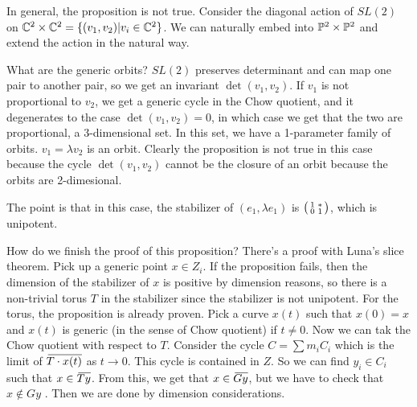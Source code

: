 \begin{remark}
 In general, the proposition is not true. Consider the diagonal action of $SL(2)$ on $\mathbb{C}^2\times \mathbb{C}^2=\{(v_1,v_2)|v_i\in \mathbb{C}^2\}$. We can naturally embed into $\mathbb{P}^2\times \mathbb{P}^2$ and extend the action in the natural way.
 
 What are the generic orbits? $SL(2)$ preserves determinant and can map one pair to another pair, so we get an invariant $\det(v_1,v_2)$. If $v_1$ is not proportional to $v_2$, we get a generic cycle in the Chow quotient, and it degenerates to the case $\det(v_1,v_2)=0$, in which case we get that the two are proportional, a 3-dimensional set. In this set, we have a 1-parameter family of orbits. $v_1=\lambda v_2$ is an orbit. Clearly the proposition is not true in this case because the cycle $\det(v_1,v_2)$ cannot be the closure of an orbit because the orbits are 2-dimesional.
 
 The point is that in this case, the stabilizer of $(e_1,\lambda e_1)$ is $\bigl(\begin{smallmatrix} 1&*\\ 0&1 \end{smallmatrix}\bigr)$, which is unipotent.
\end{remark}
How do we finish the proof of this proposition? There's a proof with Luna's slice theorem. Pick up a generic point $x\in Z_i$. If the proposition fails, then the dimension of the stabilizer of $x$ is positive by dimension reasons, so there is a non-trivial torus $T$ in the stabilizer since the stabilizer is not unipotent. For the torus, the proposition is already proven. Pick a curve $x(t)$ such that $x(0)=x$ and $x(t)$ is generic (in the sense of Chow quotient) if $t\neq 0$. Now we can tak the Chow quotient with respect to $T$. Consider the cycle $C=\sum m_i C_i$ which is the limit of $\bbar {T\cdot x(t)}$ as $t\to 0$. This cycle is contained in $Z$. So we can find $y_i\in C_i$ such that $x\in \bbar{Ty}$. From this, we get that $x\in \bbar{Gy}$, but we have to check that $x\not\in Gy$ . Then we are done by dimension considerations. 